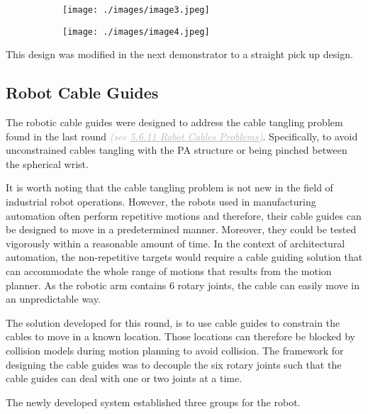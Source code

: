 \begin{figure}[H]
\centering
\begin{subfigure}[b]{0.45\textwidth}
\centering
\texttt{[image: ./images/image3.jpeg]}
\end{subfigure}
\hfill
\begin{subfigure}[b]{0.45\textwidth}
\centering
\texttt{[image: ./images/image4.jpeg]}
\end{subfigure}
\end{figure}


This design was modified in the next demonstrator to a straight pick up design.

\subsection{Robot Cable Guides}

The robotic cable guides were designed to address the cable tangling problem found in the last round \textit{\textcolor[HTML]{B7B7B7}{(see \uline{5.6.11 Robot Cables Problems)}}}. Specifically, to avoid unconstrained cables tangling with the PA structure or being pinched between the spherical wrist. 

It is worth noting that the cable tangling problem is not new in the field of industrial robot operations. However, the robots used in manufacturing automation often perform repetitive motions and therefore, their cable guides can be designed to move in a predetermined manner. Moreover, they could be tested vigorously within a reasonable amount of time. In the context of architectural automation, the non-repetitive targets would require a cable guiding solution that can accommodate the whole range of motions that results from the motion planner. As the robotic arm contains 6 rotary joints, the cable can easily move in an unpredictable way.

The solution developed for this round, is to use cable guides to constrain the cables to move in a known location. Those locations can therefore be blocked by collision models during motion planning to avoid collision. The framework for designing the cable guides was to decouple the six rotary joints such that the cable guides can deal with one or two joints at a time. 

The newly developed system established three groups for the robot.


